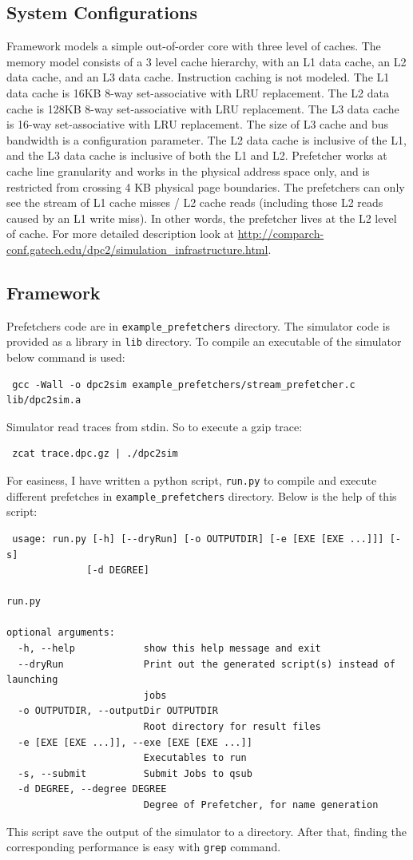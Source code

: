 \documentclass{article}
\begin{document}
\subsection{System Configurations}
Framework models a simple out-of-order core with three level of caches. The memory model consists of a 3 level cache hierarchy, with an L1 data cache, an L2 data cache, and an L3 data cache. Instruction caching is not modeled. The L1 data cache is 16KB 8-way set-associative with LRU replacement. The L2 data cache is 128KB 8-way set-associative with LRU replacement. The L3 data cache is 16-way set-associative with LRU replacement. The size of L3 cache and bus bandwidth is a configuration parameter. The L2 data cache is inclusive of the L1, and the L3 data cache is inclusive of both the L1 and L2. Prefetcher works at cache line granularity and works in the physical address space only, and is restricted from crossing 4 KB physical page boundaries. The prefetchers can only see the stream of L1 cache misses / L2 cache reads (including those L2 reads caused by an L1 write miss). In other words, the prefetcher lives at the L2 level of cache. For more detailed description look at \url{http://comparch-conf.gatech.edu/dpc2/simulation_infrastructure.html}.

\subsection{Framework}
Prefetchers code are in \verb+example_prefetchers+ directory. The simulator code is provided as a library in \verb+lib+ directory. To compile an executable of the simulator below command is used:
\footnotesize\begin{verbatim}
 gcc -Wall -o dpc2sim example_prefetchers/stream_prefetcher.c lib/dpc2sim.a
\end{verbatim}\normalsize
Simulator read traces from stdin. So to execute a gzip trace:
\footnotesize\begin{verbatim}
 zcat trace.dpc.gz | ./dpc2sim
\end{verbatim}\normalsize
For easiness, I have written a python script, \verb+run.py+ to compile and execute different prefetches in \verb+example_prefetchers+ directory. Below is the help of this script:
\footnotesize\begin{verbatim}
 usage: run.py [-h] [--dryRun] [-o OUTPUTDIR] [-e [EXE [EXE ...]]] [-s]
              [-d DEGREE]

run.py

optional arguments:
  -h, --help            show this help message and exit
  --dryRun              Print out the generated script(s) instead of launching
                        jobs
  -o OUTPUTDIR, --outputDir OUTPUTDIR
                        Root directory for result files
  -e [EXE [EXE ...]], --exe [EXE [EXE ...]]
                        Executables to run
  -s, --submit          Submit Jobs to qsub
  -d DEGREE, --degree DEGREE
                        Degree of Prefetcher, for name generation
\end{verbatim}\normalsize
This script save the output of the simulator to a directory. After that, finding the corresponding performance is easy with \verb+grep+ command.
\end{document}
